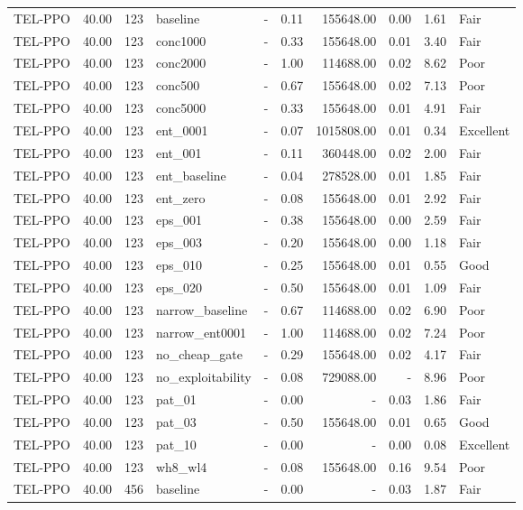 \begin{table}[htbp]
\begin{tabular}{lrrlrrrrrl}
TEL-PPO & 40.00 & 123 & baseline & - & 0.11 & 155648.00 & 0.00 & 1.61 & Fair \\
TEL-PPO & 40.00 & 123 & conc1000 & - & 0.33 & 155648.00 & 0.01 & 3.40 & Fair \\
TEL-PPO & 40.00 & 123 & conc2000 & - & 1.00 & 114688.00 & 0.02 & 8.62 & Poor \\
TEL-PPO & 40.00 & 123 & conc500 & - & 0.67 & 155648.00 & 0.02 & 7.13 & Poor \\
TEL-PPO & 40.00 & 123 & conc5000 & - & 0.33 & 155648.00 & 0.01 & 4.91 & Fair \\
TEL-PPO & 40.00 & 123 & ent_0001 & - & 0.07 & 1015808.00 & 0.01 & 0.34 & Excellent \\
TEL-PPO & 40.00 & 123 & ent_001 & - & 0.11 & 360448.00 & 0.02 & 2.00 & Fair \\
TEL-PPO & 40.00 & 123 & ent_baseline & - & 0.04 & 278528.00 & 0.01 & 1.85 & Fair \\
TEL-PPO & 40.00 & 123 & ent_zero & - & 0.08 & 155648.00 & 0.01 & 2.92 & Fair \\
TEL-PPO & 40.00 & 123 & eps_001 & - & 0.38 & 155648.00 & 0.00 & 2.59 & Fair \\
TEL-PPO & 40.00 & 123 & eps_003 & - & 0.20 & 155648.00 & 0.00 & 1.18 & Fair \\
TEL-PPO & 40.00 & 123 & eps_010 & - & 0.25 & 155648.00 & 0.01 & 0.55 & Good \\
TEL-PPO & 40.00 & 123 & eps_020 & - & 0.50 & 155648.00 & 0.01 & 1.09 & Fair \\
TEL-PPO & 40.00 & 123 & narrow_baseline & - & 0.67 & 114688.00 & 0.02 & 6.90 & Poor \\
TEL-PPO & 40.00 & 123 & narrow_ent0001 & - & 1.00 & 114688.00 & 0.02 & 7.24 & Poor \\
TEL-PPO & 40.00 & 123 & no_cheap_gate & - & 0.29 & 155648.00 & 0.02 & 4.17 & Fair \\
TEL-PPO & 40.00 & 123 & no_exploitability & - & 0.08 & 729088.00 & - & 8.96 & Poor \\
TEL-PPO & 40.00 & 123 & pat_01 & - & 0.00 & - & 0.03 & 1.86 & Fair \\
TEL-PPO & 40.00 & 123 & pat_03 & - & 0.50 & 155648.00 & 0.01 & 0.65 & Good \\
TEL-PPO & 40.00 & 123 & pat_10 & - & 0.00 & - & 0.00 & 0.08 & Excellent \\
TEL-PPO & 40.00 & 123 & wh8_wl4 & - & 0.08 & 155648.00 & 0.16 & 9.54 & Poor \\
TEL-PPO & 40.00 & 456 & baseline & - & 0.00 & - & 0.03 & 1.87 & Fair \\

\end{tabular}
\end{table}
